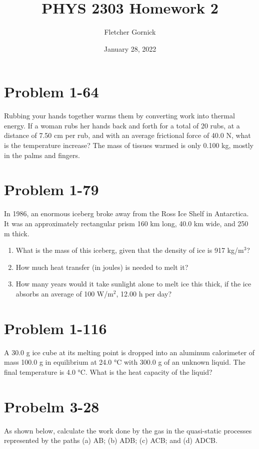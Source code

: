 \documentclass[11pt]{article}
\title{\vspace{-1.0cm}PHYS 2303 Homework 2}
\author{Fletcher Gornick}
\date{January 28, 2022}
\begin{document}
 \maketitle 
 \section*{Problem 1-64}
 Rubbing your hands together warms them by converting work into thermal energy. If a
 woman rubs her hands back and forth for a total of 20 rubs, at a distance of 7.50 cm per rub,
 and with an average frictional force of 40.0 N, what is the temperature increase? The mass of
 tissues warmed is only 0.100 kg, mostly in the palms and fingers.
 \newpage

 \section*{Problem 1-79}
 In 1986, an enormous iceberg broke away from the Ross Ice Shelf in Antarctica. It was 
 an approximately rectangular prism 160 km long, 40.0 km wide, and 250 m thick.

 \begin{enumerate}[label=(\alph*)]
   \item What is the mass of this iceberg, given that the density of ice is 917 kg/m\(^3\)?

   \item How much heat transfer (in joules) is needed to melt it?

   \item How many years would it take sunlight alone to melt ice this thick, if the ice absorbs 
     an average of 100 W/m\(^2\), 12.00 h per day?
 \end{enumerate}
 \newpage

 \section*{Problem 1-116}
 A 30.0 g ice cube at its melting point is dropped into an aluminum calorimeter of mass 100.0 g 
 in equilibrium at 24.0 °C with 300.0 g of an unknown liquid. The final temperature is 4.0 °C. 
 What is the heat capacity of the liquid?
 \newpage

 \section*{Probelm 3-28}
 As shown below, calculate the work done by the gas in the quasi-static processes represented by 
 the paths (a) AB; (b) ADB; (c) ACB; and (d) ADCB. \\
\end{document}
